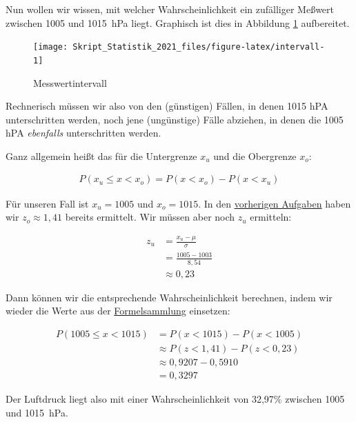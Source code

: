 \documentclass[
  11pt,
  ngerman,
  a4paper,
]{report}
\begin{document}
Nun wollen wir wissen, mit welcher Wahrscheinlichkeit ein zufälliger Meßwert zwischen 1005 und 1015~hPa liegt. Graphisch ist dies in Abbildung \ref{fig:intervall} aufbereitet.

\begin{figure}[!h]

{\centering \texttt{[image: Skript\_Statistik\_2021\_files/figure-latex/intervall-1]} 

}

\caption{Messwertintervall}\label{fig:intervall}
\end{figure}

Rechnerisch müssen wir also von den (günstigen) Fällen, in denen 1015 hPA unterschritten werden, noch jene (ungünstige) Fälle abziehen, in denen die 1005 hPA \emph{ebenfalls} unterschritten werden.

Ganz allgemein heißt das für die Untergrenze \(x_u\) und die Obergrenze \(x_o\):

\[\begin{aligned}
    P(x_{u} \leq x < x_{o}) = P(x < x_{o}) - P(x < x_{u})
  \end{aligned}
  \label{eq:intervall}
\]

Für unseren Fall ist \(x_u=1005\) und \(x_o=1015\). In den \protect\hyperlink{unter}{vorherigen Aufgaben} haben wir \(z_o\approx1,41\) bereits ermittelt. Wir müssen aber noch \(z_u\) ermitteln:

\[\begin{aligned}
    z_u &= \frac{x_u-\mu}{\sigma} \\[4pt]
        &= \frac{1005-1003}{8{,}54}  \\[4pt]
        &\approx 0{,}23
\end{aligned}\]

Dann können wir die entsprechende Wahrscheinlichkeit berechnen, indem wir wieder die Werte aus der \href{Formelsammlung\%20und\%20Wertetabellen.pdf}{Formelsammlung} einsetzen:

\[
  \begin{aligned}
    P(1005 \leq x < 1015) &= P(x < 1015) - P(x < 1005) \\
    &\approx P(z < 1{,}41) - P(z < 0{,}23) \\
    &\approx 0{,}9207- 0{,}5910  \\
    &= 0{,}3297
  \end{aligned}
\]

Der Luftdruck liegt also mit einer Wahrscheinlichkeit von 32,97\% zwischen 1005 und 1015~hPa.
\end{document}
